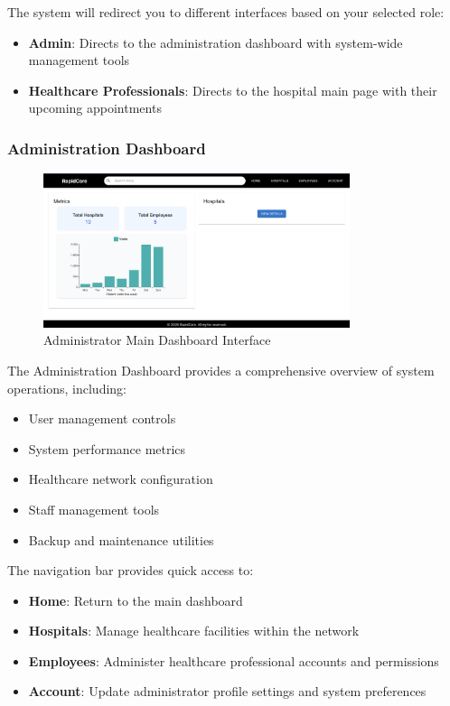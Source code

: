\documentclass[12pt, titlepage]{article}
\begin{document}
The system will redirect you to different interfaces based on your selected role:
\begin{itemize}
\item \textbf{Admin}: Directs to the administration dashboard with system-wide management tools
\item \textbf{Healthcare Professionals}: Directs to the hospital main page with their upcoming appointments
\end{itemize}

\subsubsection{Administration Dashboard}
\begin{figure}[H]
\centering
\includegraphics[width=0.8\textwidth]{admin.png}
\caption{Administrator Main Dashboard Interface}
\label{fig:admin_dashboard}
\end{figure}

The Administration Dashboard provides a comprehensive overview of system operations, including:
\begin{itemize}
\item User management controls
\item System performance metrics
\item Healthcare network configuration
\item Staff management tools
\item Backup and maintenance utilities
\end{itemize}

The navigation bar provides quick access to:
\begin{itemize}
\item \textbf{Home}: Return to the main dashboard
\item \textbf{Hospitals}: Manage healthcare facilities within the network
\item \textbf{Employees}: Administer healthcare professional accounts and permissions
\item \textbf{Account}: Update administrator profile settings and system preferences
\end{itemize}
\end{document}
